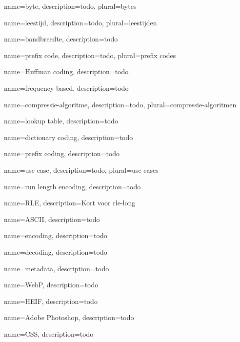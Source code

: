 {
	name={byte},
	description={todo},
	plural={bytes}
}

{
	name={leestijd},
	description={todo},
	plural={leestijden}
}

{
	name={bandbreedte},
	description={todo}
}

{
	name={prefix code},
	description={todo},
	plural={prefix codes}
}

{
	name={Huffman coding},
	description={todo}
}

{
	name={frequency-based},
	description={todo}
}

{
	name={compressie-algoritme},
	description={todo},
	plural={compressie-algoritmen}
}

{
	name={lookup table},
	description={todo}
}

{
	name={dictionary coding},
	description={todo}
}

{
	name={prefix coding},
	description={todo}
}

{
	name={use case},
	description={todo},
	plural={use cases}
}

{
	name={run length encoding},
	description={todo}
}

{
	name={RLE},
	description={Kort voor \gls{rle-long}}
}

{
	name={ASCII},
	description={todo}
}

{
	name={encoding},
	description={todo}
}

{
	name={decoding},
	description={todo}
}

{
	name={metadata},
	description={todo}
}

{
	name={WebP},
	description={todo}
}

{
	name={HEIF},
	description={todo}
}

{
	name={Adobe Photoshop},
	description={todo}
}

{
	name={CSS},
	description={todo}
}

